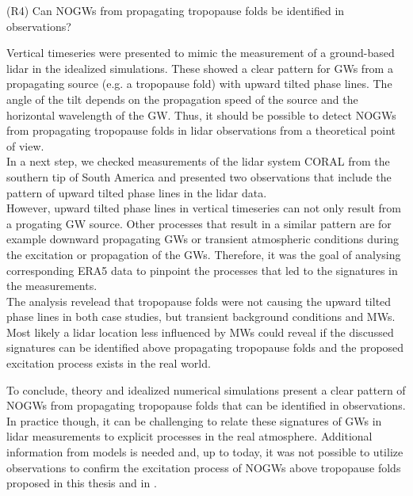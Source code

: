 \begin{tcolorbox}[]
    (R4) Can NOGWs from propagating tropopause folds be identified in observations?
\end{tcolorbox}

Vertical timeseries were presented to mimic the measurement of a ground-based lidar in the idealized simulations. These showed a clear pattern for GWs from a propagating source (e.g. a tropopause fold) with upward tilted phase lines. The angle of the tilt depends on the propagation speed of the source and the horizontal wavelength of the GW. Thus, it should be possible to detect NOGWs from propagating tropopause folds in lidar observations from a theoretical point of view. \\
In a next step, we checked measurements of the lidar system CORAL from the southern tip of South America and presented two observations that include the pattern of upward tilted phase lines in the lidar data. \\
However, upward tilted phase lines in vertical timeseries can not only result from a progating GW source. Other processes that result in a similar pattern are for example downward propagating GWs or transient atmospheric conditions during the excitation or propagation of the GWs. Therefore, it was the goal of analysing corresponding ERA5 data to pinpoint the processes that led to the signatures in the measurements. \\
The analysis revelead that tropopause folds were not causing the upward tilted phase lines in both case studies, but transient background conditions and MWs. Most likely a lidar location less influenced by MWs could reveal if the discussed signatures can be identified above propagating tropopause folds and the proposed excitation process exists in the real world.

To conclude, theory and idealized numerical simulations present a clear pattern of NOGWs from propagating tropopause folds that can be identified in observations. In practice though, it can be challenging to relate these signatures of GWs in lidar measurements to explicit processes in the real atmosphere. Additional information from models is needed and, up to today, it was not possible to utilize observations to confirm the excitation process of NOGWs above tropopause folds proposed in this thesis and in \textcite[]{dornbrack_stratospheric_2022}.
